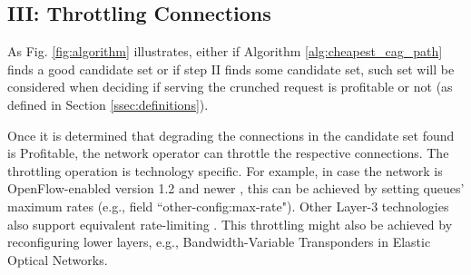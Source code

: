 \documentclass[journal]{IEEEtran}
\begin{document}



\subsection{\textbf{III: Throttling Connections}}

As Fig. \ref{fig:algorithm} illustrates, either if Algorithm \ref{alg:cheapest_cag_path} finds a good candidate set or if step II finds some candidate set, such set will be considered when deciding if serving the crunched request is profitable or not (as defined in Section \ref{ssec:definitions}).

Once it is determined that degrading the connections in the candidate set found is Profitable, the network operator can throttle the respective connections. The throttling operation is technology specific. For example, in case the network is OpenFlow-enabled version 1.2 and newer \cite{pfaff2012openflow}, this can be achieved by setting queues' maximum rates (e.g., field ``other-config:max-rate"). Other Layer-3 technologies also support equivalent rate-limiting \cite{Kumar:2015:BFH:2785956.2787478}. This throttling might also be achieved by reconfiguring lower layers, e.g., Bandwidth-Variable Transponders \cite{7045405} in Elastic Optical Networks. %
\end{document}
